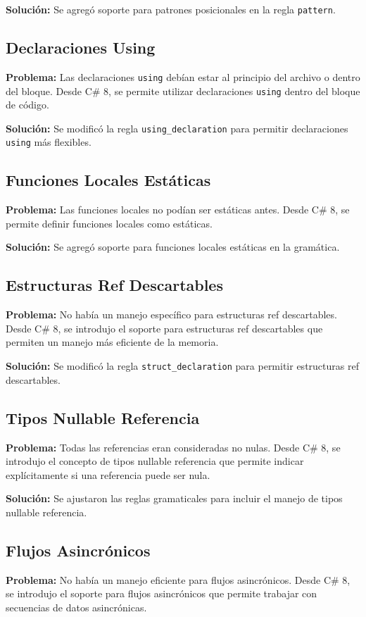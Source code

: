\textbf{Solución:} Se agregó soporte para patrones posicionales en la regla \texttt{pattern}.

\subsection*{Declaraciones Using}
\textbf{Problema:} Las declaraciones \texttt{using} debían estar al principio del archivo o dentro del bloque. Desde C\# 8, se permite utilizar declaraciones \texttt{using} dentro del bloque de código.

\textbf{Solución:} Se modificó la regla \texttt{using\_declaration} para permitir declaraciones \texttt{using} más flexibles.

\subsection*{Funciones Locales Estáticas}
\textbf{Problema:} Las funciones locales no podían ser estáticas antes. Desde C\# 8, se permite definir funciones locales como estáticas.

\textbf{Solución:} Se agregó soporte para funciones locales estáticas en la gramática.

\subsection*{Estructuras Ref Descartables}
\textbf{Problema:} No había un manejo específico para estructuras ref descartables. Desde C\# 8, se introdujo el soporte para estructuras ref descartables que permiten un manejo más eficiente de la memoria.

\textbf{Solución:} Se modificó la regla \texttt{struct\_declaration} para permitir estructuras ref descartables.

\subsection*{Tipos Nullable Referencia}
\textbf{Problema:} Todas las referencias eran consideradas no nulas. Desde C\# 8, se introdujo el concepto de tipos nullable referencia que permite indicar explícitamente si una referencia puede ser nula.

\textbf{Solución:} Se ajustaron las reglas gramaticales para incluir el manejo de tipos nullable referencia.

\subsection*{Flujos Asincrónicos}
\textbf{Problema:} No había un manejo eficiente para flujos asincrónicos. Desde C\# 8, se introdujo el soporte para flujos asincrónicos que permite trabajar con secuencias de datos asincrónicas.

